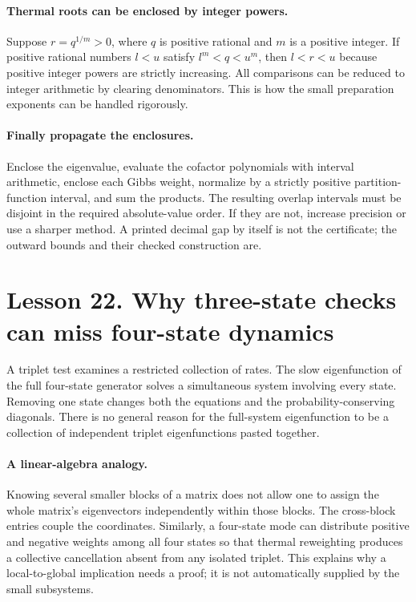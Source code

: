 \documentclass[11pt]{article}
\begin{document}
\paragraph{Thermal roots can be enclosed by integer powers.}
Suppose $r=q^{1/m}>0$, where $q$ is positive rational and $m$ is a positive
integer. If positive rational numbers $l<u$ satisfy $l^m<q<u^m$, then
$l<r<u$ because positive integer powers are strictly increasing. All
comparisons can be reduced to integer arithmetic by clearing denominators.
This is how the small preparation exponents can be handled rigorously.

\paragraph{Finally propagate the enclosures.}
Enclose the eigenvalue, evaluate the cofactor polynomials with interval
arithmetic, enclose each Gibbs weight, normalize by a strictly positive
partition-function interval, and sum the products. The resulting overlap
intervals must be disjoint in the required absolute-value order. If they
are not, increase precision or use a sharper method. A printed decimal
gap by itself is not the certificate; the outward bounds and their checked
construction are.

\clearpage
\section*{Lesson 22. Why three-state checks can miss four-state dynamics}
A triplet test examines a restricted collection of rates. The slow
eigenfunction of the full four-state generator solves a simultaneous system
involving every state. Removing one state changes both the equations and
the probability-conserving diagonals. There is no general reason for the
full-system eigenfunction to be a collection of independent triplet
eigenfunctions pasted together.

\paragraph{A linear-algebra analogy.}
Knowing several smaller blocks of a matrix does not allow one to assign the
whole matrix's eigenvectors independently within those blocks. The
cross-block entries couple the coordinates. Similarly, a four-state mode
can distribute positive and negative weights among all four states so that
thermal reweighting produces a collective cancellation absent from any
isolated triplet. This explains why a local-to-global implication needs a
proof; it is not automatically supplied by the small subsystems.
\end{document}
